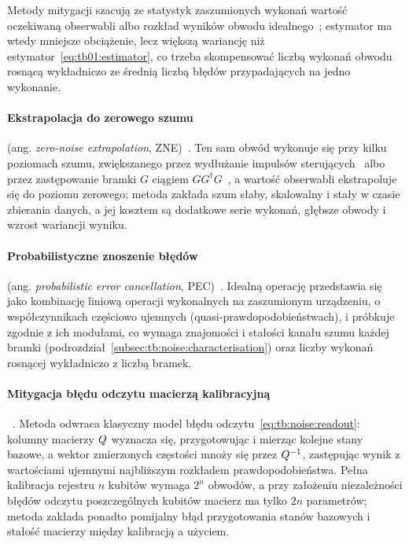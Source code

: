 Metody mitygacji szacują ze statystyk zaszumionych wykonań wartość oczekiwaną obserwabli albo rozkład wyników obwodu idealnego~\cite{cai2023quantum}; estymator ma wtedy mniejsze obciążenie, lecz większą wariancję niż estymator~\eqref{eq:tb01:estimator}, co trzeba skompensować liczbą wykonań obwodu rosnącą wykładniczo ze średnią liczbą błędów przypadających na jedno wykonanie.

\paragraph{Ekstrapolacja do zerowego szumu} (ang. \emph{zero-noise extrapolation}, ZNE)~\cite{richardson-extrapolation,quasi-probability}.
Ten sam obwód wykonuje się przy kilku poziomach szumu, zwiększanego przez wydłużanie impulsów sterujących~\cite{kandala2021hardware} albo przez zastępowanie bramki $G$ ciągiem $GG^{\dagger}G$~\cite{giurgica-tiron_digital_2020}, a wartość obserwabli ekstrapoluje się do poziomu zerowego; metoda zakłada szum słaby, skalowalny i stały w czasie zbierania danych, a jej kosztem są dodatkowe serie wykonań, głębsze obwody i wzrost wariancji wyniku.

\paragraph{Probabilistyczne znoszenie błędów} (ang. \emph{probabilistic error cancellation}, PEC)~\cite{quasi-probability,endo_practical_2018}.
Idealną operację przedstawia się jako kombinację liniową operacji wykonalnych na zaszumionym urządzeniu, o współczynnikach częściowo ujemnych (quasi-praw\-do\-po\-do\-bień\-stwach), i próbkuje zgodnie z ich modułami, co wymaga znajomości i stałości kanału szumu każdej bramki (podrozdział~\ref{subsec:tb:noise:characterisation}) oraz liczby wykonań rosnącej wykładniczo z liczbą bramek.

\paragraph{Mitygacja błędu odczytu macierzą kalibracyjną}~\cite{maciejewski_mitigation_2020,bravyi_mitigating_2021}.
Metoda odwraca klasyczny model błędu odczytu~\eqref{eq:tb:noise:readout}: kolumny macierzy $Q$ wyznacza się, przygotowując i mierząc kolejne stany bazowe, a wektor zmierzonych częstości mnoży się przez $Q^{-1}$, zastępując wynik z wartościami ujemnymi najbliższym rozkładem prawdopodobieństwa.
Pełna kalibracja rejestru $n$ kubitów wymaga $2^n$ obwodów, a przy założeniu niezależności błędów odczytu poszczególnych kubitów macierz ma tylko $2n$ parametrów; metoda zakłada ponadto pomijalny błąd przygotowania stanów bazowych i stałość macierzy między kalibracją a użyciem.

